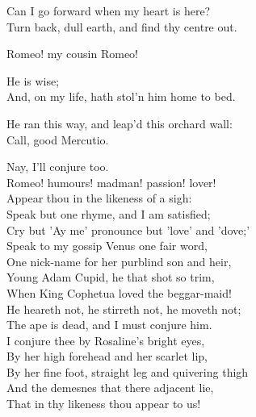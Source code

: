  
\begin{speech}
Can I go forward when my heart is here? \\
Turn back, dull earth, and find thy centre out. 
 \\
\end{speech}
\begin{speech}
Romeo! my cousin Romeo! \\
\end{speech}
\begin{speech}
He is wise; \\
And, on my life, hath stol'n him home to bed. \\
\end{speech}
\begin{speech}
He ran this way, and leap'd this orchard wall: \\

Call, good Mercutio. \\
\end{speech}
\begin{speech}
Nay, I'll conjure too. \\
Romeo! humours! madman! passion! lover! \\
Appear thou in the likeness of a sigh: \\
Speak but one rhyme, and I am satisfied; \\
Cry but 'Ay me' pronounce but 'love' and 'dove;' \\
Speak to my gossip Venus one fair word, \\
One nick-name for her purblind son and heir, \\
Young Adam Cupid, he that shot so trim, \\
When King Cophetua loved the beggar-maid! \\
He heareth not, he stirreth not, he moveth not; \\
The ape is dead, and I must conjure him. \\
I conjure thee by Rosaline's bright eyes, \\
By her high forehead and her scarlet lip, \\
By her fine foot, straight leg and quivering thigh \\
And the demesnes that there adjacent lie, \\
That in thy likeness thou appear to us! \\
\end{speech}
